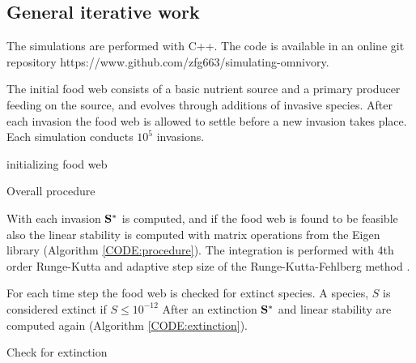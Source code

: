 \subsection{General iterative work}
The simulations are performed with C++. The code is available in an online git repository \newline https://www.github.com/zfg663/simulating-omnivory.

The initial food web consists of a basic nutrient source and a primary producer feeding on the source, and evolves through additions of invasive species. After each invasion the food web is allowed to settle before a new invasion takes place. Each simulation conducts $10^5$ invasions.
\begin{algorithm}
\SetAlgoLined
 initializing food web\;
 \caption{Overall procedure}
 \label{CODE:procedure}
\end{algorithm}
With each invasion $\bf{S^*}$ is computed, and if the food web is found to be feasible also the linear stability is computed with matrix operations from the Eigen library \cite{eigen} (Algorithm \ref{CODE:procedure}). 
The integration is performed with 4th order Runge-Kutta \cite{atkinson2008introduction} and adaptive step size of the Runge-Kutta-Fehlberg method \cite{}.

For each time step the food web is checked for extinct species. A species, $S$ is considered extinct if $S \leq 10^{-12}$ %
After an extinction $\bf{S^*}$ and linear stability are computed again (Algorithm \ref{CODE:extinction}). %
\begin{algorithm}
\SetAlgoLined
{}
 \caption{Check for extinction}
 \label{CODE:extinction}
\end{algorithm}

